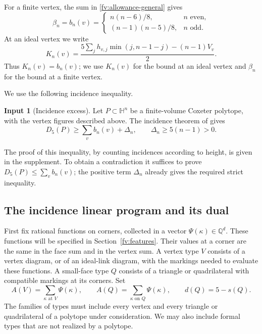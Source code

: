 \documentclass[11pt]{article}
\theoremstyle{definition}
\newtheorem{assumption}[theorem]{Input}
\theoremstyle{remark}
\numberwithin{equation}{section}
\newcommand{\HH}{\mathbb H}
\newcommand{\Q}{\mathbb Q}
\begin{document}
For a finite vertex, the sum in \eqref{fv:allowance-general} gives
\begin{equation}\label{fv:finite-allowance}
 \beta_n=b_n(v)=
 \begin{cases}
 n(n-6)/8,&n\text{ even},\\
 (n-1)(n-5)/8,&n\text{ odd}.
 \end{cases}
\end{equation}
At an ideal vertex we write
\begin{equation}\label{fv:ideal-allowance}
 K_n(v)=\frac{5\sum_jh_{v,j}\min(j,n-1-j)-(n-1)V_v}{2}.
\end{equation}
Thus $K_n(v)=b_n(v)$; we use $K_n(v)$ for the bound at an ideal
vertex and $\beta_n$ for the bound at a finite vertex.

We use the following incidence inequality.

\begin{assumption}[Incidence excess]\label{fv:incidence-excess}
Let $P\subset\HH^n$ be a finite-volume Coxeter polytope, with the
vertex figures described above. The incidence theorem of
\cite{BoundsSupplement} gives
\begin{equation}\label{fv:incidence-excess-eq}
 D_5(P)\ge\sum_v b_n(v)+\Delta_n,
 \qquad \Delta_n\ge5(n-1)>0.
\end{equation}
\end{assumption}

The proof of this inequality, by counting incidences according to
height, is given in the supplement. To obtain a contradiction it
suffices to prove $D_5(P)\le\sum_vb_n(v)$; the positive term
$\Delta_n$ already gives the required strict inequality.

\subsection{The incidence linear program and its dual}
\label{fv:incidence-primal}

First fix rational functions on corners, collected in a vector
$\Psi(\kappa)\in\Q^d$. These functions will be specified in
Section~\ref{fv:features}. Their values at a corner are the same in
the face sum and in the vertex sum. A vertex type $V$ consists of a
vertex diagram, or of an ideal-link diagram, with the markings needed
to evaluate these functions. A small-face type $Q$ consists of a
triangle or quadrilateral with compatible markings at its corners.
Set
\begin{equation}\label{fv:feature-sums}
 A(V)=\sum_{\kappa\text{ at }V}\Psi(\kappa),\qquad
 A(Q)=\sum_{\kappa\text{ on }Q}\Psi(\kappa),\qquad
 d(Q)=5-s(Q).
\end{equation}
The families of types must include every vertex and every triangle
or quadrilateral of a polytope under consideration. We may also
include formal types that are not realized by a polytope.
\end{document}
